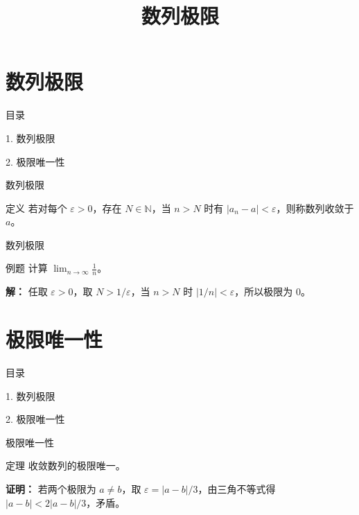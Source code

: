 \documentclass[aspectratio=169,10pt,fontset=fandol]{ctexbeamer}
\title{数列极限}
\begin{document}
\section{数列极限}
\begin{frame}[t,fragile]{目录}
\normalsize
{\color{blue}\normalsize 1. 数列极限\par}\vspace{0.3em}
{\color{gray!40}\normalsize 2. 极限唯一性\par}\vspace{0.3em}
\end{frame}
\begin{frame}[t,fragile]{数列极限}
\normalsize
\begin{block}{定义}
{\normalsize
若对每个 $\varepsilon>0$，存在 $N\in\mathbb{N}$，当 $n>N$ 时有 $|a_n-a|<\varepsilon$，则称数列收敛于 $a$。
}
\end{block}
\end{frame}
\begin{frame}[t,fragile]{数列极限}
\normalsize
\begin{block}{例题}
{\normalsize
计算 $\lim_{n\to\infty}\frac1n$。
}
\end{block}
\pause
{\normalsize
\textbf{解：}
任取 $\varepsilon>0$，取 $N>1/\varepsilon$，当 $n>N$ 时 $|1/n|<\varepsilon$，所以极限为 $0$。
}
\end{frame}
\section{极限唯一性}
\begin{frame}[t,fragile]{目录}
\normalsize
{\color{black}\normalsize 1. 数列极限\par}\vspace{0.3em}
{\color{blue}\normalsize 2. 极限唯一性\par}\vspace{0.3em}
\end{frame}
\begin{frame}[t,fragile]{极限唯一性}
\normalsize
\begin{block}{定理}
{\normalsize
收敛数列的极限唯一。
}
\end{block}
\pause
{\normalsize
\textbf{证明：}
若两个极限为 $a\ne b$，取 $\varepsilon=|a-b|/3$，由三角不等式得 $|a-b|<2|a-b|/3$，矛盾。
}
\end{frame}
\end{document}

